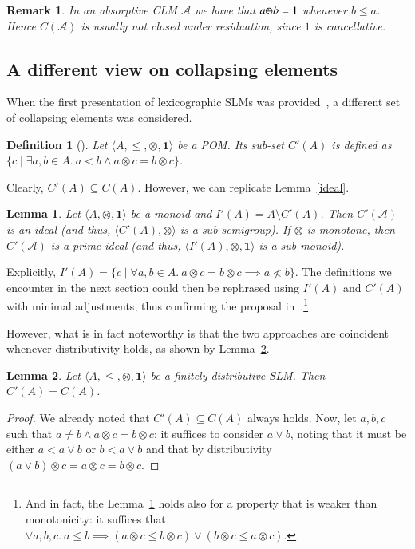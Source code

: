 \documentclass[a4paper]{elsarticle}
\newtheorem{definition}{Definition}
\newtheorem{remark}{Remark}
\newtheorem{lemma}{Lemma}
\newcommand{\monop}{\otimes}
\newcommand{\1}{\mathbf{1}}
\def\odiv{{ \ominus\hspace{-8pt}:}\;}
\begin{document}
\begin{remark}
	In an absorptive CLM $\mathcal{A}$ we have that $a \odiv b = 1$ 
	whenever $b \leq a$. Hence $C(\mathcal{A})$ is usually not closed under residuation, since 
	$1$ is cancellative.
\end{remark}

\subsection{A different view on collapsing elements}

When the first presentation of lexicographic 
SLMs was provided~\cite{GadducciHMW13}, a different 
set of collapsing elements was considered.

\begin{definition}[\cite{GadducciHMW13}]
	Let $\langle A, \leq, \monop, \1 \rangle$ be a POM. Its sub-set $C'(A)$ 
	is defined as 
	$\{ c \mid \exists a, b \in A.\ a < b \wedge a \otimes c = b \otimes c\}$.
\end{definition}

Clearly, $C'(A) \subseteq C(A)$. However, we can replicate Lemma~\ref{ideal}.
%

\begin{lemma}\label{lemma:six}
	Let $\langle A, \monop, \1 \rangle$ be a monoid
	and $I'(A) = A \setminus C'(A)$.
	Then $C'(\mathcal{A})$ is an ideal 
	(and thus, $\langle C'(A), \monop \rangle$ is a sub-semigroup).
	If $\monop$ is monotone, then 
	$C'(\mathcal{A})$ is a prime ideal
	(and thus, $\langle I'(A), \monop, \1 \rangle$ is a sub-monoid).
\end{lemma}

Explicitly, $I'(A) = \{ c \mid \forall a, b \in A.\ a \otimes c = b \otimes c \implies a \not < b \}$.
%
The definitions we encounter in the next section 
could then be rephrased using 
$I'(A)$ and $C'(A)$ with minimal adjustments, thus confirming the proposal
in~\cite{GadducciHMW13}.\footnote{And in fact, the Lemma~\ref{lemma:six} holds also for 
	a property that is weaker than monotonicity: it suffices that 
	$\forall a, b, c.\ a \leq b \implies (a \otimes c \leq b \otimes c) \vee (b \otimes c \leq a \otimes c)$.
}

However, what is in fact noteworthy is that the two approaches are coincident
whenever distributivity holds, as shown by  Lemma~\ref{lemma:seven}.

\begin{lemma}\label{lemma:seven}
	Let $\langle A, \leq, \monop, \1 \rangle$ be a finitely distributive SLM.
	Then $C'(A) = C(A)$.
\end{lemma}
\begin{proof}
	We already noted that $C'(A) \subseteq C(A)$ always holds. Now, let $a, b, c$ such that
	$a \neq b \wedge a \otimes c = b \otimes c$: it suffices to consider $a \vee b$, noting 
	that it must be either $a < a \vee b$ or $b < a \vee b$ and that by distributivity 
	$(a \vee b) \otimes c = a \otimes c = b \otimes c$.
\end{proof}
\end{document}
